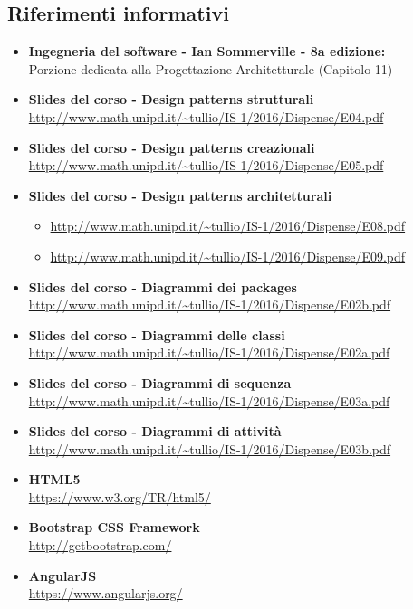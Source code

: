 \subsection{Riferimenti informativi}
\begin{itemize}
	\item \textbf{Ingegneria del software - Ian Sommerville - 8a edizione:}\\
	Porzione dedicata alla Progettazione Architetturale (Capitolo 11)
	\item \textbf{Slides del corso - Design patterns strutturali}\\
	\url{http://www.math.unipd.it/~tullio/IS-1/2016/Dispense/E04.pdf}
	\item \textbf{Slides del corso - Design patterns creazionali}\\
	\url{http://www.math.unipd.it/~tullio/IS-1/2016/Dispense/E05.pdf}
	\item \textbf{Slides del corso - Design patterns architetturali}
	\begin{itemize}
		\item \url{http://www.math.unipd.it/~tullio/IS-1/2016/Dispense/E08.pdf}
		\item \url{http://www.math.unipd.it/~tullio/IS-1/2016/Dispense/E09.pdf}
	\end{itemize}
	\item \textbf{Slides del corso - Diagrammi dei packages}\\
	\url{http://www.math.unipd.it/~tullio/IS-1/2016/Dispense/E02b.pdf}
	\item \textbf{Slides del corso - Diagrammi delle classi}\\
	\url{http://www.math.unipd.it/~tullio/IS-1/2016/Dispense/E02a.pdf}
	\item \textbf{Slides del corso - Diagrammi di sequenza}\\
	\url{http://www.math.unipd.it/~tullio/IS-1/2016/Dispense/E03a.pdf}
	\item \textbf{Slides del corso - Diagrammi di attività}\\
	\url{http://www.math.unipd.it/~tullio/IS-1/2016/Dispense/E03b.pdf}
	\item \textbf{HTML5}\\
	\url{https://www.w3.org/TR/html5/}
	\item \textbf{Bootstrap CSS Framework}\\
	\url{http://getbootstrap.com/}
	\item \textbf{AngularJS}\\
	\url{https://www.angularjs.org/}

\end{itemize}
